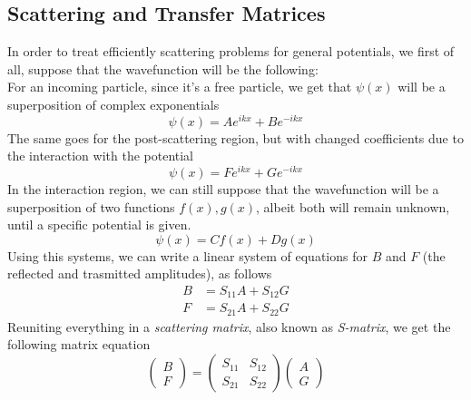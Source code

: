 \documentclass[../qm.tex]{subfiles}
\begin{document}
	\subsection{Scattering and Transfer Matrices}
	In order to treat efficiently scattering problems for general potentials, we first of all, suppose that the wavefunction will be the following:\\
	For an incoming particle, since it's a free particle, we get that $\psi(x)$ will be a superposition of complex exponentials
	\begin{equation}
		\psi(x)=Ae^{ikx}+Be^{-ikx}
		\label{eq:incomingscattering}
	\end{equation}
	The same goes for the post-scattering region, but with changed coefficients due to the interaction with the potential
	\begin{equation}
		\psi(x)=Fe^{ikx}+Ge^{-ikx}
		\label{eq:outgoingscattering}
	\end{equation}
	In the interaction region, we can still suppose that the wavefunction will be a superposition of two functions $f(x),g(x)$, albeit both will remain unknown, until a specific potential is given.
	\begin{equation}
		\psi(x)=Cf(x)+Dg(x)
		\label{eq:scatteringregion}
	\end{equation}
	Using this systems, we can write a linear system of equations for $B$ and $F$ (the reflected and trasmitted amplitudes), as follows
	\begin{equation}
		\begin{aligned}
			B&=S_{11}A+S_{12}G\\
			F&=S_{21}A+S_{22}G
		\end{aligned}
		\label{eq:scatteringsystem}
	\end{equation}
	Reuniting everything in a \textit{scattering matrix}, also known as \textit{S-matrix}, we get the following matrix equation
	\begin{equation}
		\begin{pmatrix}
			B\\
			F
		\end{pmatrix}=\begin{pmatrix}
			S_{11}&S_{12}\\
			S_{21}&S_{22}
		\end{pmatrix}\begin{pmatrix}
			A\\
			G
		\end{pmatrix}
		\label{eq:scatteringmatrix}
	\end{equation}
\end{document}
